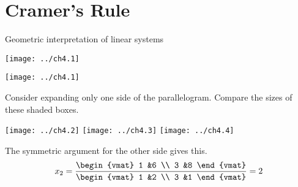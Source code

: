 \documentclass[10pt,t]{beamer}
\begin{document}
\section{Cramer's Rule}
\begin{frame}{Geometric interpretation of linear systems}
\begin{center}
 \texttt{[image: ../ch4.1]}
\end{center}
\end{frame}
\begin{frame}
\begin{center}
 \texttt{[image: ../ch4.1]}
\end{center}
\end{frame}
\begin{frame}
Consider expanding only one side of the parallelogram.
Compare the sizes of these shaded boxes.
\begin{center}
   \texttt{[image: ../ch4.2]}
   \hfil
   \texttt{[image: ../ch4.3]}
   \hfil
   \texttt{[image: ../ch4.4]}
\end{center}
\pause
{}
\end{frame}
\begin{frame}
\pause
{}
\pause
The symmetric argument for the other side gives this.
\begin{equation*}
  x_2=
  \frac{
  \begin{vmat}
    1  &6  \\
    3  &8
  \end{vmat}}{
  \begin{vmat}
    1  &2  \\
    3  &1
  \end{vmat}}
  =2
\end{equation*}
\end{frame}
\end{document}

